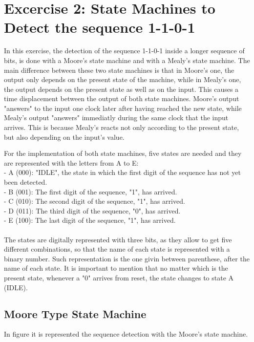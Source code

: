 

\section{\color{olive}Excercise 2: State Machines to Detect the sequence 1-1-0-1}
In this exercise, the detection of the sequence 1-1-0-1 inside a longer sequence of bits, is done with a Moore's state machine and with a Mealy's state machine. The main difference between these two state machines is that in Moore's one, the output only depends on the present state of the machine, while in Mealy's one, the output depends on the present state as well as on the input. This causes a time displacement between the output of both state machines. Moore's output "answers" to the input one clock later after having reached the new state, while Mealy's output "answers" immediatly during the same clock that the input arrives. This is because Mealy's reacts not only according to the present state, but also depending on the input's value.

For the implementation of both state machines, five states are needed and they are represented with the letters from A to E:\\ 
- A (000): "IDLE", the state in which the first digit of the sequence has not yet been detected.\\
- B (001): The first digit of the sequence, "1", has arrived.\\
- C (010): The second digit of the sequence, "1",  has arrived.\\
- D (011): The third digit of the sequence, "0", has arrived.\\
- E (100): The last digit of the sequence, "1", has arrived.\\ \\
The states are digitally represented with three bits, as they allow to get five different combinations, so that the name of each state is represented with a binary number. Such representation is the one givin between parenthese, after the name of each state.  It is important to mention that no matter which is the present state, whenever a "0" arrives from reset, the state changes to state A (IDLE). 

\subsection{\color{purple}Moore Type State Machine}

In figure %
it is represented the sequence detection with the Moore's state machine.


